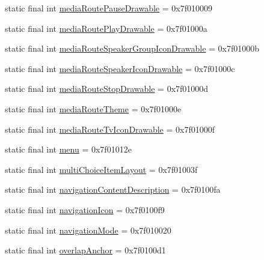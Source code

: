 \begin{CompactItemize}
\item 
static final int \hyperlink{classandroid_1_1support_1_1v7_1_1cardview_1_1_r_1_1attr_56899ff424afe4d4febdb9c8dc109933}{mediaRoutePauseDrawable} = 0x7f010009
\item 
static final int \hyperlink{classandroid_1_1support_1_1v7_1_1cardview_1_1_r_1_1attr_9c0051e9ef661c1591bfbbfe285aae2b}{mediaRoutePlayDrawable} = 0x7f01000a
\item 
static final int \hyperlink{classandroid_1_1support_1_1v7_1_1cardview_1_1_r_1_1attr_0760f32e3e3077fc81f2efffaf419ea5}{mediaRouteSpeakerGroupIconDrawable} = 0x7f01000b
\item 
static final int \hyperlink{classandroid_1_1support_1_1v7_1_1cardview_1_1_r_1_1attr_21d2072bca318929a5f1c9e998db1213}{mediaRouteSpeakerIconDrawable} = 0x7f01000c
\item 
static final int \hyperlink{classandroid_1_1support_1_1v7_1_1cardview_1_1_r_1_1attr_02097491a2c9f1af6e5fb43e3462c98c}{mediaRouteStopDrawable} = 0x7f01000d
\item 
static final int \hyperlink{classandroid_1_1support_1_1v7_1_1cardview_1_1_r_1_1attr_410dc70cf0c4c6bd1004f8a053e0d483}{mediaRouteTheme} = 0x7f01000e
\item 
static final int \hyperlink{classandroid_1_1support_1_1v7_1_1cardview_1_1_r_1_1attr_05b80e33113d38239a7e75bdf5034a9d}{mediaRouteTvIconDrawable} = 0x7f01000f
\item 
static final int \hyperlink{classandroid_1_1support_1_1v7_1_1cardview_1_1_r_1_1attr_9f451acd48edf1c9fdf9540c2d4e1c3e}{menu} = 0x7f01012e
\item 
static final int \hyperlink{classandroid_1_1support_1_1v7_1_1cardview_1_1_r_1_1attr_18dba2c5eae8e6a4702a59d9fb5a855c}{multiChoiceItemLayout} = 0x7f01003f
\item 
static final int \hyperlink{classandroid_1_1support_1_1v7_1_1cardview_1_1_r_1_1attr_7b959fbf11ec4cc41578442621962b1e}{navigationContentDescription} = 0x7f0100fa
\item 
static final int \hyperlink{classandroid_1_1support_1_1v7_1_1cardview_1_1_r_1_1attr_4d531884caccdf69708dee617c267a1c}{navigationIcon} = 0x7f0100f9
\item 
static final int \hyperlink{classandroid_1_1support_1_1v7_1_1cardview_1_1_r_1_1attr_b63dd8cb50d2b84468354d26d90088c3}{navigationMode} = 0x7f010020
\item 
static final int \hyperlink{classandroid_1_1support_1_1v7_1_1cardview_1_1_r_1_1attr_abe7f509bb92d3438a2a9277f22c7ed5}{overlapAnchor} = 0x7f0100d1

\end{CompactItemize}
